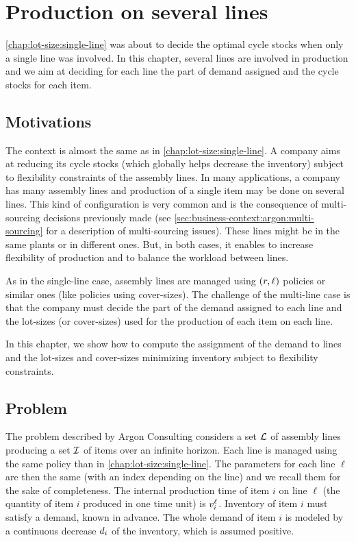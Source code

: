 \chapter{Production on several lines}
\label{chap:lot-size:several-lines}



\cref{chap:lot-size:single-line} was about to decide the optimal cycle stocks when only a single line was involved.
In this chapter, several lines are involved in production and we aim at deciding for each line the part of demand assigned and the cycle stocks for each item.



\section{Motivations}
\label{sec:lot-size:several-lines:motivations}


The context is almost the same as in \cref{chap:lot-size:single-line}.
A company aims at reducing its cycle stocks (which globally helps decrease the inventory) subject to flexibility constraints of the assembly lines.
In many applications, a company has many assembly lines and production of a single item may be done on several lines.
This kind of configuration is very common and is the consequence of multi-sourcing decisions previously made (see \cref{sec:business-context:argon:multi-sourcing} for a description of multi-sourcing issues).
These lines might be in the same plants or in different ones.
But, in both cases, it enables to increase flexibility of production and to balance the workload between lines.


As in the single-line case, assembly lines are managed using $(r,\ell)$ policies or similar ones (like policies using cover-sizes).
The challenge of the multi-line case is that the company must decide the part of the demand assigned to each line and the lot-sizes (or cover-sizes) used for the production of each item on each line.


In this chapter, we show how to compute the assignment of the demand to lines and the lot-sizes and cover-sizes minimizing inventory subject to flexibility constraints.


\section{Problem}


The problem described by Argon Consulting considers a set $\mathcal{L}$ of assembly lines producing a set $\mathcal{I}$ of items over an infinite horizon.
Each line is managed using the same policy than in \cref{chap:lot-size:single-line}.
The parameters for each line $\ell$ are then the same (with an index depending on the line) and we recall them for the sake of completeness.
The internal production time of item $i$ on line $\ell$ (\ie the quantity of item $i$ produced in one time unit) is $v_i^{\ell}$.
Inventory of item $i$ must satisfy a demand, known in advance.
The whole demand of item $i$ is modeled by a continuous decrease $d_i$ of the inventory, which is assumed positive.




